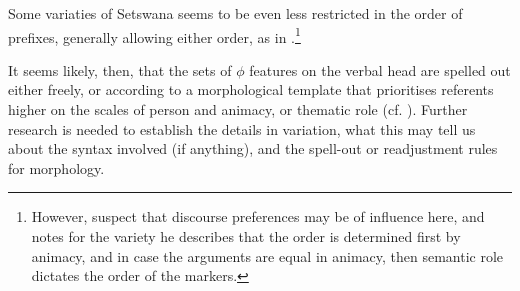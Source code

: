 \documentclass[output=paper
,modfonts
,nonflat]{langsci/langscibook}
\begin{document}
Some variaties of Setswana seems to be even less restricted in the order of prefixes, generally allowing either order, as in .\footnote{However, \citet{Pretorius_et_al2012} suspect that discourse preferences may be of influence here, and \citet{Creissels2002} notes for the variety he describes that the order is determined first by animacy, and in case the arguments are equal in animacy, then semantic role dictates the order of the markers.} 

It seems likely, then, that the sets of $\phi$ features on the verbal head are spelled out either freely, or according to a morphological template that prioritises referents higher on the scales of person and animacy, or thematic role (cf. \citealt{Duranti1979}). Further research is needed to establish the details in variation, what this may tell us about the syntax involved (if anything), and the spell-out or readjustment rules for morphology.
\end{document}
